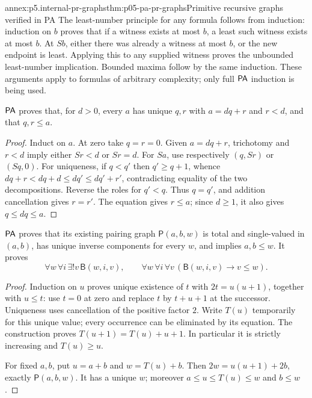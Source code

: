 \begin{annexitem}{annex:p5.internal-pr-graphs}{thm:p05-pa-pr-graphs}{Primitive recursive graphs verified in PA}
The least-number principle for any formula follows from induction: induction
on \(b\) proves that if a witness exists at most \(b\), a least such witness
exists at most \(b\).  At \(Sb\), either there was already a witness at
most \(b\), or the new endpoint is least.  Applying this to any supplied
witness proves the unbounded least-number implication.  Bounded maxima follow
by the same induction.  These arguments apply to formulas of arbitrary
complexity; only full \(\mathsf{PA}\) induction is being used.

\begin{annexlemma}
\label{lem:p05-pa-division}
\(\mathsf{PA}\) proves that, for \(d>0\), every \(a\) has unique \(q,r\) with
\(a=dq+r\) and \(r<d\), and that \(q,r\leq a\).
\end{annexlemma}
\begin{proof}
Induct on \(a\).  At zero take \(q=r=0\).  Given \(a=dq+r\),
trichotomy and \(r<d\) imply either \(Sr<d\) or \(Sr=d\).
For \(Sa\), use respectively \((q,Sr)\) or \((Sq,0)\).
For uniqueness, if \(q<q'\) then \(q'\geq q+1\), whence
\(dq+r<dq+d\leq dq'\leq dq'+r'\), contradicting equality of the
two decompositions.  Reverse the roles for \(q'<q\).  Thus \(q=q'\),
and addition cancellation gives \(r=r'\).  The equation gives \(r\leq a\);
since \(d\geq1\), it also gives \(q\leq dq\leq a\).
\end{proof}

\begin{annexlemma}
\label{lem:p05-pa-pair-beta}
\(\mathsf{PA}\) proves that its existing pairing graph \(\mathsf P(a,b,w)\)
is total and single-valued in \((a,b)\), has unique inverse components
for every \(w\), and implies \(a,b\leq w\).  It proves
\[
 \forall w\,\forall i\,\exists!v\,\mathsf B(w,i,v),
 \qquad
 \forall w\,\forall i\,\forall v\,
       (\mathsf B(w,i,v)\to v\leq w).
\]
\end{annexlemma}
\begin{proof}
Induction on \(u\) proves unique existence of \(t\) with
\(2t=u(u+1)\), together with \(u\leq t\): use \(t=0\) at zero
and replace \(t\) by \(t+u+1\) at the successor.  Uniqueness uses
cancellation of the positive factor \(2\).  Write \(T(u)\) temporarily
for this unique value; every occurrence can be eliminated by its equation.
The construction proves \(T(u+1)=T(u)+u+1\).  In particular it is strictly
increasing and \(T(u)\geq u\).

For fixed \(a,b\), put \(u=a+b\) and \(w=T(u)+b\).
Then \(2w=u(u+1)+2b\), exactly \(\mathsf P(a,b,w)\).
It has a unique \(w\); moreover \(a\leq u\leq T(u)\leq w\)
and \(b\leq w\).


\end{proof}
\end{annexitem}
